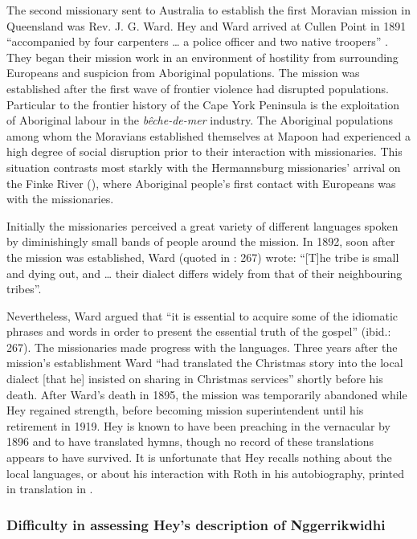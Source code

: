 The second missionary sent to Australia to establish the first Moravian mission in Queensland was Rev. J. G. Ward. Hey and Ward arrived at Cullen Point in 1891 “accompanied by four carpenters … a police officer and two native troopers” \citep[234]{edwards_moravian_2007}. They began their mission work in an environment of hostility from surrounding Europeans and suspicion from Aboriginal populations. The mission was established after the first wave of frontier violence had disrupted populations. Particular to the frontier history of the Cape York Peninsula is the exploitation of Aboriginal labour in the \textit{bêche-de-mer} industry. The Aboriginal populations among whom the Moravians established themselves at Mapoon had experienced a high degree of social disruption prior to their interaction with missionaries. This situation contrasts most starkly with the Hermannsburg missionaries' arrival on the Finke River (), where Aboriginal people’s first contact with Europeans was with the missionaries.

Initially the missionaries perceived a great variety of different languages spoken by diminishingly small bands of people around the mission. In {1892}, soon after the mission was established, Ward (quoted in \citealt{edwards_moravian_2007}: 267) wrote: “[T]he tribe is small and dying out, and … their dialect differs widely from that of their neighbouring tribes”.

Nevertheless, Ward argued that “it is essential to acquire some of the idiomatic phrases and words in order to present the essential truth of the gospel” (ibid.: 267). The missionaries made progress with the languages. Three years after the mission’s establishment Ward “had translated the Christmas story into the local dialect [that he] insisted on sharing in Christmas services” \citep[242]{edwards_moravian_2007} shortly before his death. After Ward’s death in 1895, the mission was temporarily abandoned while Hey regained strength, before becoming mission superintendent until his retirement in 1919. Hey is known to have been preaching in the vernacular by 1896 and to have translated hymns, though no record of these translations appears to have survived. It is unfortunate that Hey recalls nothing about the local languages, or about his interaction with Roth in his autobiography, printed in translation in \citet[367--383]{edwards_moravian_2007}.

\subsubsection{Difficulty in assessing Hey’s description of Nggerrikwidhi}
\label{sec:key:10.1.3.1}

